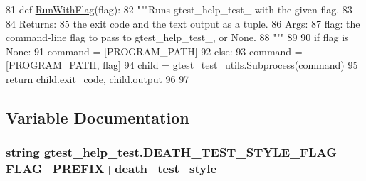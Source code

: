 \begin{DoxyCode}
81 \textcolor{keyword}{def }\hyperlink{namespacegtest__help__test_a3d369750dac11a6dca523139fe1e6c86}{RunWithFlag}(flag):
82   \textcolor{stringliteral}{"""Runs gtest\_help\_test\_ with the given flag.}
83 \textcolor{stringliteral}{}
84 \textcolor{stringliteral}{  Returns:}
85 \textcolor{stringliteral}{    the exit code and the text output as a tuple.}
86 \textcolor{stringliteral}{  Args:}
87 \textcolor{stringliteral}{    flag: the command-line flag to pass to gtest\_help\_test\_, or None.}
88 \textcolor{stringliteral}{  """}
89 
90   \textcolor{keywordflow}{if} flag \textcolor{keywordflow}{is} \textcolor{keywordtype}{None}:
91     command = [PROGRAM\_PATH]
92   \textcolor{keywordflow}{else}:
93     command = [PROGRAM\_PATH, flag]
94   child = \hyperlink{classgtest__test__utils_1_1Subprocess}{gtest\_test\_utils.Subprocess}(command)
95   \textcolor{keywordflow}{return} child.exit\_code, child.output
96 
97 
\end{DoxyCode}


\subsection{Variable Documentation}
\subsubsection[{\texorpdfstring{D\+E\+A\+T\+H\+\_\+\+T\+E\+S\+T\+\_\+\+S\+T\+Y\+L\+E\+\_\+\+F\+L\+AG}{DEATH_TEST_STYLE_FLAG}}]{\setlength{\rightskip}{0pt plus 5cm}string gtest\+\_\+help\+\_\+test.\+D\+E\+A\+T\+H\+\_\+\+T\+E\+S\+T\+\_\+\+S\+T\+Y\+L\+E\+\_\+\+F\+L\+AG = {\bf F\+L\+A\+G\+\_\+\+P\+R\+E\+F\+IX}+\textquotesingle{}death\+\_\+test\+\_\+style\textquotesingle{}}\hypertarget{namespacegtest__help__test_a322bbb8bf27d7701c76fb5704a1fda1f}{}\label{namespacegtest__help__test_a322bbb8bf27d7701c76fb5704a1fda1f}
